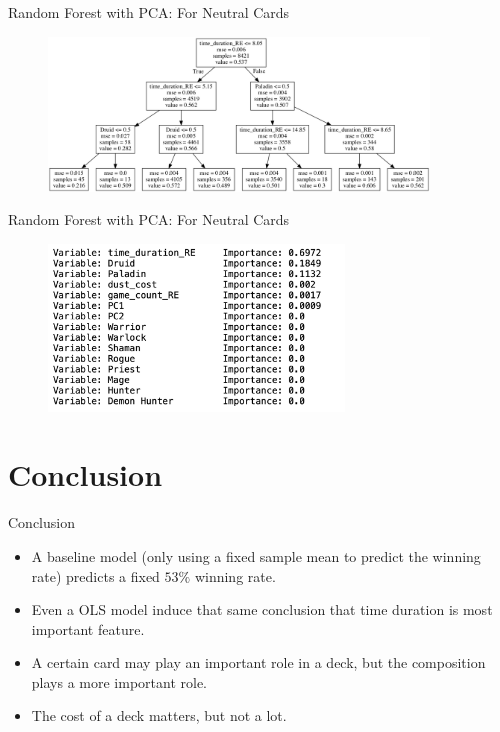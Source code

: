 \documentclass[12pt]{beamer}
\begin{document}
\begin{frame}[fragile]{Random Forest with PCA: For Neutral Cards}

	\begin{figure}
		\begin{center}
			\includegraphics[width=0.9\textwidth]{figure/plot/3a_no_hero.png}
		\end{center}
	\end{figure}

\end{frame}

\begin{frame}[fragile]{Random Forest with PCA: For Neutral Cards}

	\begin{figure}
		\begin{center}
			\includegraphics[width=0.7\textwidth]{figure/plot/3a_no_hero_importance.png}
		\end{center}
	\end{figure}

\end{frame}



\section{Conclusion}

\begin{frame}[fragile]{Conclusion}

	\begin{itemize}
		\item A baseline model (only using a fixed sample mean to predict the winning rate) predicts a fixed $53\%$ winning rate.
		\item Even a OLS model induce that same conclusion that time duration is most important feature.
		\item A certain card may play an important role in a deck, but the composition plays a more important role.
		\item The cost of a deck matters, but not a lot.
	\end{itemize}

\end{frame}
\end{document}
